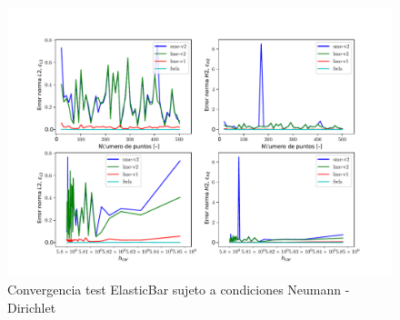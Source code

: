 \begin{figure}
    \centering
    \includegraphics[width=1\textwidth]{./Imagenes/06/comparacion_shp_irreg/ElasticBar_irreg_type-2_caso-3_direct_dgesv-lapack-blas_sme-v2_lme-v2_lme-v1_fwls.pdf}
    \caption{Convergencia test ElasticBar sujeto a condiciones Neumann - Dirichlet} \label{fig:ElasticBar_caso-3_conv_irreg}
\end{figure}


